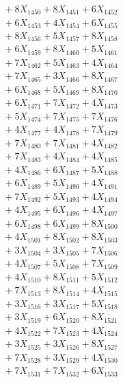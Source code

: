 \documentclass[a4paper,10pt]{article}
\begin{document}
{\begin{align}
&\;  + 8 X_{1450} + 8 X_{1451} + 6 X_{1452} \\[0.3ex]
&\;  + 6 X_{1453} + 4 X_{1454} + 6 X_{1455} \\[0.3ex]
&\;  + 8 X_{1456} + 5 X_{1457} + 8 X_{1458} \\[0.3ex]
&\;  + 6 X_{1459} + 8 X_{1460} + 5 X_{1461} \\[0.3ex]
&\;  + 7 X_{1462} + 5 X_{1463} + 4 X_{1464} \\[0.3ex]
&\;  + 7 X_{1465} + 3 X_{1466} + 8 X_{1467} \\[0.3ex]
&\;  + 6 X_{1468} + 5 X_{1469} + 8 X_{1470} \\[0.3ex]
&\;  + 6 X_{1471} + 7 X_{1472} + 4 X_{1473} \\[0.3ex]
&\;  + 5 X_{1474} + 7 X_{1475} + 7 X_{1476} \\[0.3ex]
&\;  + 4 X_{1477} + 4 X_{1478} + 7 X_{1479} \\[0.5ex]\allowbreak
&\;  + 7 X_{1480} + 7 X_{1481} + 4 X_{1482} \\[0.3ex]
&\;  + 7 X_{1483} + 4 X_{1484} + 4 X_{1485} \\[0.3ex]
&\;  + 4 X_{1486} + 6 X_{1487} + 5 X_{1488} \\[0.3ex]
&\;  + 6 X_{1489} + 5 X_{1490} + 4 X_{1491} \\[0.3ex]
&\;  + 7 X_{1492} + 5 X_{1493} + 4 X_{1494} \\[0.3ex]
&\;  + 4 X_{1495} + 6 X_{1496} + 4 X_{1497} \\[0.3ex]
&\;  + 6 X_{1498} + 6 X_{1499} + 8 X_{1500} \\[0.3ex]
&\;  + 4 X_{1501} + 8 X_{1502} + 8 X_{1503} \\[0.3ex]
&\;  + 3 X_{1504} + 3 X_{1505} + 7 X_{1506} \\[0.3ex]
&\;  + 4 X_{1507} + 5 X_{1508} + 7 X_{1509} \\[0.5ex]\allowbreak
&\;  + 4 X_{1510} + 8 X_{1511} + 5 X_{1512} \\[0.3ex]
&\;  + 7 X_{1513} + 8 X_{1514} + 4 X_{1515} \\[0.3ex]
&\;  + 3 X_{1516} + 3 X_{1517} + 5 X_{1518} \\[0.3ex]
&\;  + 3 X_{1519} + 6 X_{1520} + 8 X_{1521} \\[0.3ex]
&\;  + 4 X_{1522} + 7 X_{1523} + 4 X_{1524} \\[0.3ex]
&\;  + 3 X_{1525} + 3 X_{1526} + 8 X_{1527} \\[0.3ex]
&\;  + 7 X_{1528} + 3 X_{1529} + 4 X_{1530} \\[0.3ex]
&\;  + 7 X_{1531} + 7 X_{1532} + 6 X_{1533} \\[0.3ex]

\end{align}}
\end{document}
